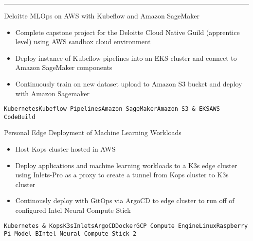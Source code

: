 \documentclass[9pt]{resume} %
\begin{document}
\begin{minipage}[t]{1\textwidth}
	
	\hrule
	\begin{entrylist}{Deloitte}
		\entry
			{MLOps on AWS with Kubeflow and Amazon SageMaker}
			{}
		{{\begin{itemize}[noitemsep,topsep=0pt,leftmargin=*]
			\item Complete capstone project for the Deloitte Cloud Native Guild (apprentice level) using AWS sandbox cloud environment
			\item Deploy instance of Kubeflow pipelines into an EKS cluster and connect to Amazon SageMaker components
			\item Continuously train on new dataset upload to Amazon S3 bucket and deploy with Amazon Sagemaker			
		\end{itemize}}			
			{\addtolength{\leftskip}{3mm}\texttt{Kubernetes}\slashsep\texttt{Kubeflow Pipelines}\slashsep\texttt{Amazon SageMaker}\slashsep\texttt{Amazon S3 \& EKS}\slashsep\texttt{AWS CodeBuild}\par}}
	\end{entrylist}
	\begin{entrylist}{Personal}
		\entry
			{Edge Deployment of Machine Learning Workloads}
			{}
		{{\begin{itemize}[noitemsep,topsep=0pt,leftmargin=*]
			\item Host Kops cluster hosted in AWS
			\item Deploy applications and machine learning workloads to a K3s edge cluster using Inlets-Pro as a proxy to create a tunnel from Kops cluster to K3s cluster  
			\item Continously deploy with GitOps via ArgoCD to edge cluster to run off of configured Intel Neural Compute Stick		
		\end{itemize}}					
			{\addtolength{\leftskip}{3mm}\texttt{Kubernetes \& Kops}\slashsep\texttt{K3s}\slashsep\texttt{Inlets}\slashsep\texttt{ArgoCD}\slashsep\texttt{Docker}\slashsep\texttt{GCP Compute Engine}\slashsep\texttt{Linux}\slashsep\texttt{Raspberry Pi Model B}\slashsep\texttt{Intel Neural Compute Stick 2}\par}}
		

\end{entrylist}
\end{minipage}
\end{document}
